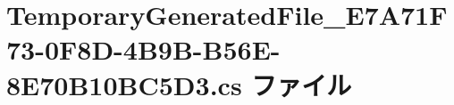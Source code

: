 \hypertarget{TemporaryGeneratedFile__E7A71F73-0F8D-4B9B-B56E-8E70B10BC5D3_8cs}{}\section{Temporary\+Generated\+File\+\_\+\+E7\+A71\+F73-\/0\+F8\+D-\/4\+B9\+B-\/\+B56\+E-\/8\+E70\+B10\+B\+C5\+D3.cs ファイル}
\label{TemporaryGeneratedFile__E7A71F73-0F8D-4B9B-B56E-8E70B10BC5D3_8cs}
